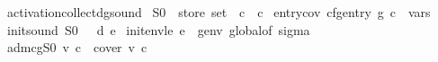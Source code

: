 \begin{isabelle}
\ activation\isacharunderscore{}collect\isacharunderscore{}dg\isacharunderscore{}sound\isacharcolon{}\isanewline
\isaindent{\ \ }\ S0\ \isacharcolon{}\isacharcolon{}\ \isachardoublequote{}store\ set\isachardoublequote{}\ \ c\ \isacharcolon{}\isacharcolon{}\ \isacharprime{}c\isanewline
\isaindent{\ \ }\ entry\isacharunderscore{}cov\isacharcolon{}\ \isachardoublequote{}\isacharparenleft{}cfg\isacharunderscore{}entry\ g\isacharcomma{}\ c\isacharparenright{}\ {\isasymin}\ vars\isachardoublequote{}\isanewline
\isaindent{\ \ \ \ }\ init\isacharunderscore{}sound\isacharcolon{}\ \isachardoublequote{}S0\ {\isasymsubseteq}\ {\isasymgamma}\ d\ e\isachardoublequote{}\isanewline
\isaindent{\ \ \ \ }\ init\isacharunderscore{}env\isacharunderscore{}le\isacharcolon{}\ \isachardoublequote{}e\ {\isasymle}\ genv\ global\isacharunderscore{}of\ sigma\isachardoublequote{}\isanewline
\isaindent{\ \ }\ \isachardoublequote{}{\isasymA}\isactrlbsub {\isasymG}\isacharcomma{}adm\isacharcomma{}c\isacharcomma{}g\isacharcomma{}S0\isactrlesub{}\ v\ c\ {\isasymsubseteq}\ cover\ v\ c\isachardoublequote{}
\end{isabelle}
